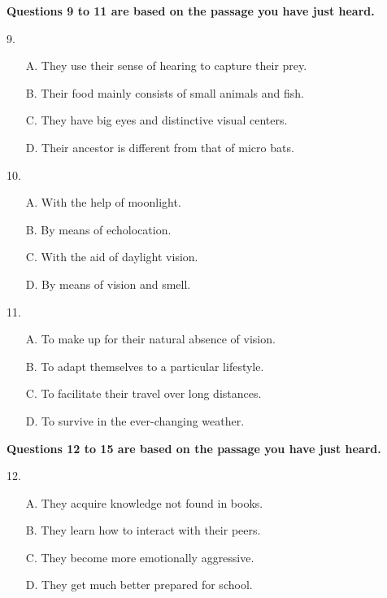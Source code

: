 \documentclass[UTF8,11pt]{ctexart}
\begin{document}
\textbf{Questions 9 to 11 are based on the passage you have just heard.}


9.


\begin{itemize}[leftmargin=2em,itemsep=.2em,topsep=.4em]\item[A.] They use their sense of hearing to capture their prey.
\item[B.] Their food mainly consists of small animals and fish.
\item[C.] They have big eyes and distinctive visual centers.
\item[D.] Their ancestor is different from that of micro bats.
\end{itemize}

10.


\begin{itemize}[leftmargin=2em,itemsep=.2em,topsep=.4em]\item[A.] With the help of moonlight.
\item[B.] By means of echolocation.
\item[C.] With the aid of daylight vision.
\item[D.] By means of vision and smell.
\end{itemize}

11.


\begin{itemize}[leftmargin=2em,itemsep=.2em,topsep=.4em]\item[A.] To make up for their natural absence of vision.
\item[B.] To adapt themselves to a particular lifestyle.
\item[C.] To facilitate their travel over long distances.
\item[D.] To survive in the ever-changing weather.
\end{itemize}

\textbf{Questions 12 to 15 are based on the passage you have just heard.}


12.


\begin{itemize}[leftmargin=2em,itemsep=.2em,topsep=.4em]\item[A.] They acquire knowledge not found in books.
\item[B.] They learn how to interact with their peers.
\item[C.] They become more emotionally aggressive.
\item[D.] They get much better prepared for school.
\end{itemize}
\end{document}
